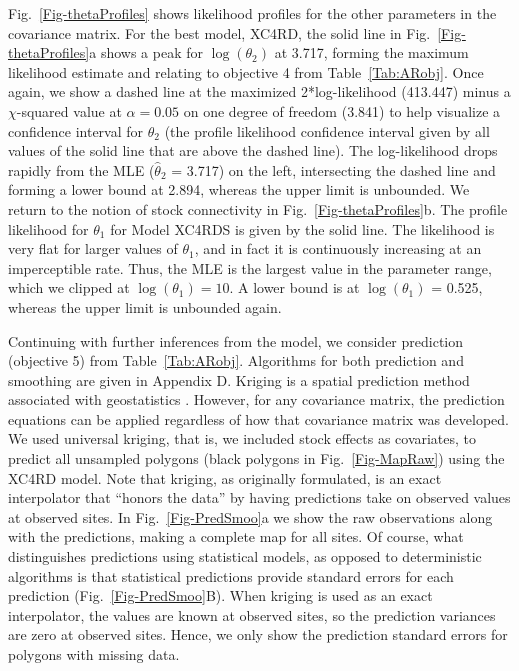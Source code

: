 \documentclass[11pt, titlepage]{article}\usepackage[]{graphicx}\usepackage[]{color}
\begin{document}
\begin{spacing}{1.9}
\begin{flushleft}
Fig.~\ref{Fig-thetaProfiles} shows likelihood profiles for the other parameters in the covariance matrix.  For the best model, XC4RD, the solid line in Fig.~\ref{Fig-thetaProfiles}a shows a peak for $\log(\theta_2)$ at 3.717, forming the maximum likelihood estimate and relating to objective 4 from Table~\ref{Tab:ARobj}. Once again, we show a dashed line at the maximized 2*log-likelihood (413.447) minus a $\chi$-squared value at $\alpha = 0.05$ on one degree of freedom (3.841) to help visualize a confidence interval for $\theta_2$ (the profile likelihood confidence interval given by all values of the solid line that are above the dashed line). The log-likelihood drops rapidly from the MLE ($\hat{\theta}_2$ = 3.717) on the left, intersecting the dashed line and forming a lower bound at 2.894, whereas the upper limit is unbounded. We return to the notion of stock connectivity in Fig.~\ref{Fig-thetaProfiles}b.  The profile likelihood for $\theta_1$ for Model XC4RDS is given by the solid line. The likelihood is very flat for larger values of $\theta_1$, and in fact it is continuously increasing at an imperceptible rate. Thus, the MLE is the largest value in the parameter range, which we clipped at $\log(\theta_1) = 10$. A lower bound is at $\log(\theta_1)$ = 0.525, whereas the upper limit is unbounded again.

Continuing with further inferences from the model, we consider prediction (objective 5) from Table~\ref{Tab:ARobj}. Algorithms for both prediction and smoothing are given in Appendix D.  Kriging is a spatial prediction method associated with geostatistics \citep{Cres:orig:1990}.  However, for any covariance matrix, the prediction equations can be applied regardless of how that covariance matrix was developed.  We used universal kriging, that is, we included stock effects as covariates, \citep[][pg. 151]{Huij:Math:univ:1971,Cres:stat:1993} to predict all unsampled polygons (black polygons in Fig.~\ref{Fig-MapRaw}) using the XC4RD model. Note that kriging, as originally formulated, is an exact interpolator \citep[pg. 129]{Cres:stat:1993} that ``honors the data'' \citep[p. 252]{Scha:Gotw:stat:2005} by having predictions take on observed values at observed sites.  In Fig.~\ref{Fig-PredSmoo}a we show the raw observations along with the predictions, making a complete map for all sites. Of course, what distinguishes predictions using statistical models, as opposed to deterministic algorithms \citep[e.g., inverse distance weighted,][]{Shep:two:1968} is that statistical predictions provide standard errors for each prediction (Fig.~\ref{Fig-PredSmoo}B).  When kriging is used as an exact interpolator, the values are known at observed sites, so the prediction variances are zero at observed sites.  Hence, we only show the prediction standard errors for polygons with missing data.  


\end{flushleft}
\end{spacing}
\end{document}
